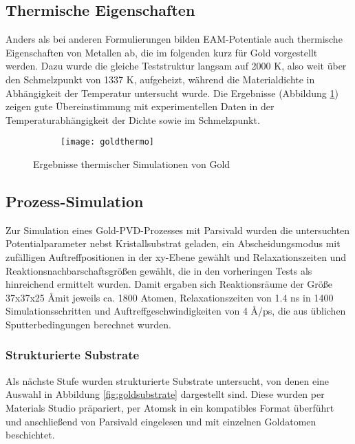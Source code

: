 
\subsection{Thermische Eigenschaften}

Anders als bei anderen Formulierungen bilden EAM-Potentiale auch thermische Eigenschaften von Metallen ab, die im folgenden kurz für Gold vorgestellt werden.
Dazu wurde die gleiche Teststruktur langsam auf 2000 K, also weit über den Schmelzpunkt von 1337 K, aufgeheizt, während die Materialdichte in Abhängigkeit der Temperatur untersucht wurde.
Die Ergebnisse (Abbildung \ref{fig:goldthermo}) zeigen gute Übereinstimmung mit experimentellen Daten in der Temperaturabhängigkeit der Dichte sowie im Schmelzpunkt.

\begin{figure}[tbp]
  \captionsetup[subfigure]{singlelinecheck=false}
  \def\subfigwidth{0.45\textwidth}
  \begin{subfigure}[t]{\subfigwidth}
    \texttt{[image: goldthermo]}
  \end{subfigure}
  \caption[Ergebnisse thermischer Simulationen von Gold]{Ergebnisse thermischer Simulationen von Gold}
  \label{fig:goldthermo}
\end{figure}

\subsection{Prozess-Simulation}

Zur Simulation eines Gold-PVD-Prozesses mit Parsivald wurden die untersuchten Potentialparameter nebst Kristallsubstrat geladen, ein Abscheidungsmodus mit zufälligen Auftreffpositionen in der xy-Ebene gewählt und Relaxationszeiten und Reaktionsnachbarschaftsgrößen gewählt, die in den vorheringen Tests als hinreichend ermittelt wurden.
Damit ergaben sich Reaktionsräume der Größe 37x37x25 \AA mit jeweils ca. 1800 Atomen, Relaxationszeiten von 1.4 ns in 1400 Simulationsschritten und Auftreffgeschwindigkeiten von 4 \AA/ps, die aus üblichen Sputterbedingungen berechnet wurden.

\subsubsection{Strukturierte Substrate}

Als nächste Stufe wurden strukturierte Substrate untersucht, von denen eine Auswahl in Abbildung \ref{fig:goldsubstrate} dargestellt sind.
Diese wurden per Materials Studio präpariert, per Atomsk in ein kompatibles Format überführt und anschließend von Parsivald eingelesen und mit einzelnen Goldatomen beschichtet.

